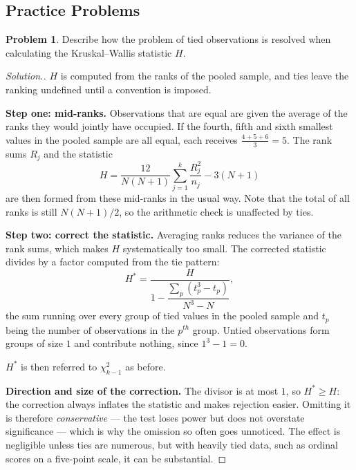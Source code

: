 \documentclass[11pt,a4paper]{article}
\theoremstyle{definition}
\newtheorem{problemx}{Problem}[section]
\newenvironment{problem}{\begin{problemx}}{\end{problemx}}
\newenvironment{solution}
  {\renewcommand{\qedsymbol}{}\begin{proof}[\textit{Solution}.]}
  {\end{proof}}
\begin{document}
\pagebreak
\pagebreak
\subsection{Practice Problems}

\begin{problem}
Describe how the problem of tied observations is resolved when calculating the
Kruskal--Wallis statistic $H$.
\end{problem}

\begin{solution}
$H$ is computed from the ranks of the pooled sample, and ties leave the ranking
undefined until a convention is imposed.

\textbf{Step one: mid-ranks.} Observations that are equal are given the average of
the ranks they would jointly have occupied. If the fourth, fifth and sixth
smallest values in the pooled sample are all equal, each receives
$\frac{4+5+6}{3}=5$. The rank sums $R_j$ and the statistic
$$H=\dfrac{12}{N(N+1)}\sum^{k}_{j=1}\dfrac{R_j^{2}}{n_j}-3(N+1)$$
are then formed from these mid-ranks in the usual way. Note that the total of all
ranks is still $N(N+1)/2$, so the arithmetic check is unaffected by ties.

\textbf{Step two: correct the statistic.} Averaging ranks reduces the variance of
the rank sums, which makes $H$ systematically too small. The corrected statistic
divides by a factor computed from the tie pattern:
$$H^{*}=\dfrac{H}{1-\dfrac{\sum_{p}\left(t_p^{3}-t_p\right)}{N^{3}-N}},$$
the sum running over every group of tied values in the pooled sample and $t_p$
being the number of observations in the $p^{th}$ group. Untied observations form
groups of size $1$ and contribute nothing, since $1^{3}-1=0$.

$H^{*}$ is then referred to $\chi^{2}_{k-1}$ as before.

\textbf{Direction and size of the correction.} The divisor is at most $1$, so
$H^{*}\geq H$: the correction always inflates the statistic and makes rejection
easier. Omitting it is therefore \emph{conservative} --- the test loses power but
does not overstate significance --- which is why the omission so often goes
unnoticed. The effect is negligible unless ties are numerous, but with heavily
tied data, such as ordinal scores on a five-point scale, it can be substantial.
\end{solution}
\end{document}

